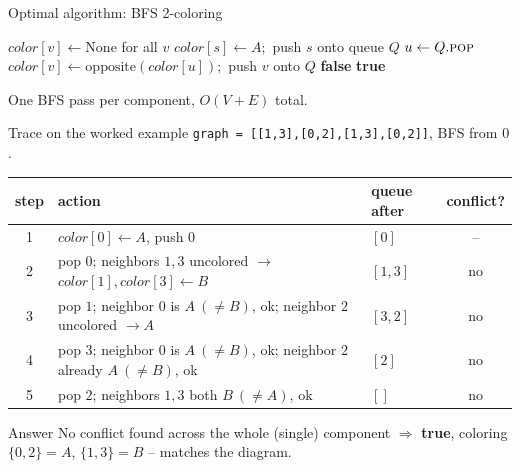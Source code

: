 \documentclass[11pt,aspectratio=169]{beamer}
\begin{document}
\begin{frame}{Optimal algorithm: BFS 2-coloring}
  \footnotesize
  \begin{algorithmic}[1]
      \State $color[v] \gets \text{None}$ for all $v$
        \State $color[s] \gets A$;\ push $s$ onto queue $Q$
          \State $u \gets Q.\Call{pop}{}$
              \State $color[v] \gets \text{opposite}(color[u])$;\ push $v$ onto $Q$
              \State \Return \textbf{false} 
            \EndIf
          \EndFor
        \EndWhile
      \EndFor
      \State \Return \textbf{true}
    \EndFunction
  \end{algorithmic}
  One BFS pass per component, $O(V+E)$ total.
\end{frame}

\begin{frame}{Trace on the worked example}
  \small
  \texttt{graph = [[1,3],[0,2],[1,3],[0,2]]}, BFS from $0$.
  \begin{center}
  \begin{tabular}{@{}cllc@{}}
    \toprule
    step & action & queue after & conflict? \\
    \midrule
    1 & $color[0]\gets A$, push $0$ & $[0]$ & -- \\
    2 & pop $0$; neighbors $1,3$ uncolored $\to$ $color[1],color[3]\gets B$ & $[1,3]$
    & no \\
    3 & pop $1$; neighbor $0$ is $A\ (\neq B)$, ok; neighbor $2$ uncolored $\to A$ &
    $[3,2]$ & no \\
    4 & pop $3$; neighbor $0$ is $A\ (\neq B)$, ok; neighbor $2$ already $A\ (\neq B)$,
    ok & $[2]$ & no \\
    5 & pop $2$; neighbors $1,3$ both $B\ (\neq A)$, ok & $[]$ & no \\
    \bottomrule
  \end{tabular}
  \end{center}
  \begin{exampleblock}{Answer}
    No conflict found across the whole (single) component $\Rightarrow$
    \textbf{true}, coloring $\{0,2\}{=}A$, $\{1,3\}{=}B$ -- matches the diagram.
  \end{exampleblock}
\end{frame}
\end{document}

